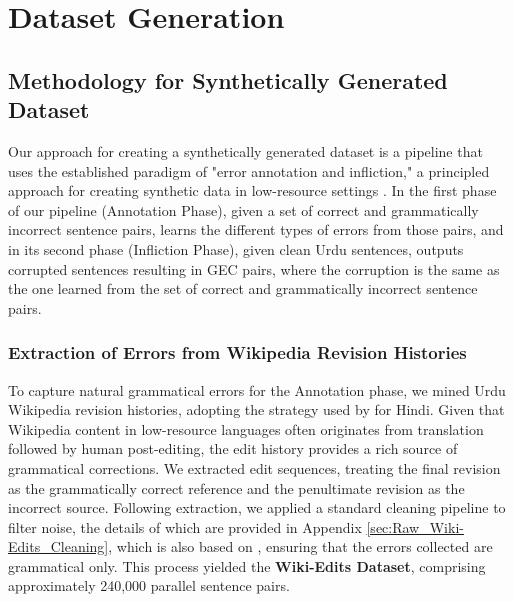 \documentclass[11pt]{article}
\begin{document}

\section{Dataset Generation}
\subsection{Methodology for Synthetically Generated Dataset}
\label{sec:Methodology_of_Dataset_Generation}

Our approach for creating a synthetically generated dataset is a pipeline that uses the established paradigm of "error annotation and infliction," a principled approach for creating synthetic data in low-resource settings \citep{alrehili2025developmentbalancedsyntheticdata}. In the first phase of our pipeline (Annotation Phase), given a set of correct and grammatically incorrect sentence pairs, learns the different types of errors from those pairs, and in its second phase (Infliction Phase), given clean Urdu sentences, outputs corrupted sentences resulting in GEC pairs, where the corruption is the same as the one learned from the set of correct and grammatically incorrect sentence pairs.

\subsubsection{Extraction of Errors from Wikipedia Revision Histories}
\label{sec:clean_wikiedits}
To capture natural grammatical errors for the Annotation phase, we mined Urdu Wikipedia revision histories, adopting the strategy used by \citet{hindi} for Hindi. Given that Wikipedia content in low-resource languages often originates from translation followed by human post-editing, the edit history provides a rich source of grammatical corrections. We extracted edit sequences, treating the final revision as the grammatically correct reference and the penultimate revision as the incorrect source. Following extraction, we applied a standard cleaning pipeline to filter noise, the details of which are provided in Appendix \ref{sec:Raw_Wiki-Edits_Cleaning}, which is also based on \cite{hindi}, ensuring that the errors collected are grammatical only. This process yielded the \textbf{Wiki-Edits Dataset}, comprising approximately 240,000 parallel sentence pairs.
\end{document}

